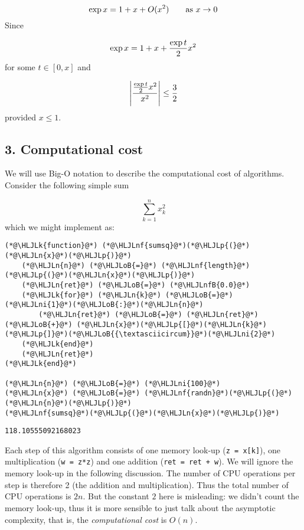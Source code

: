 \documentclass[12pt,a4paper]{article}
\newcommand{\HLJLk}[1]{\textcolor[RGB]{148,91,176}{\textbf{#1}}}
\newcommand{\HLJLn}[1]{#1}
\newcommand{\HLJLnf}[1]{\textcolor[RGB]{66,102,213}{#1}}
\newcommand{\HLJLnfB}[1]{\textcolor[RGB]{59,151,46}{#1}}
\newcommand{\HLJLni}[1]{\textcolor[RGB]{59,151,46}{#1}}
\newcommand{\HLJLoB}[1]{\textcolor[RGB]{102,102,102}{\textbf{#1}}}
\newcommand{\HLJLp}[1]{#1}
\begin{document}
\[
\exp x = 1 + x + O(x^2) \qquad \hbox{as $x \ensuremath{\rightarrow} 0$}
\]
Since

\[
\exp x = 1 + x + {\exp t \over 2} x^2
\]
for some $t \in [0,x]$ and

\[
\left|{{\exp t \over 2} x^2 \over x^2}\right| \leq {3 \over 2}
\]
provided $x \leq 1$.

\subsection{3. Computational cost}
We will use Big-O notation to describe the computational cost of algorithms. Consider the following simple sum

\[
\sum_{k=1}^n x_k^2
\]
which we might implement as:


\begin{lstlisting}
(*@\HLJLk{function}@*) (*@\HLJLnf{sumsq}@*)(*@\HLJLp{(}@*)(*@\HLJLn{x}@*)(*@\HLJLp{)}@*)
    (*@\HLJLn{n}@*) (*@\HLJLoB{=}@*) (*@\HLJLnf{length}@*)(*@\HLJLp{(}@*)(*@\HLJLn{x}@*)(*@\HLJLp{)}@*)
    (*@\HLJLn{ret}@*) (*@\HLJLoB{=}@*) (*@\HLJLnfB{0.0}@*)
    (*@\HLJLk{for}@*) (*@\HLJLn{k}@*) (*@\HLJLoB{=}@*) (*@\HLJLni{1}@*)(*@\HLJLoB{:}@*)(*@\HLJLn{n}@*)
        (*@\HLJLn{ret}@*) (*@\HLJLoB{=}@*) (*@\HLJLn{ret}@*) (*@\HLJLoB{+}@*) (*@\HLJLn{x}@*)(*@\HLJLp{[}@*)(*@\HLJLn{k}@*)(*@\HLJLp{]}@*)(*@\HLJLoB{{\textasciicircum}}@*)(*@\HLJLni{2}@*)
    (*@\HLJLk{end}@*)
    (*@\HLJLn{ret}@*)
(*@\HLJLk{end}@*)

(*@\HLJLn{n}@*) (*@\HLJLoB{=}@*) (*@\HLJLni{100}@*)
(*@\HLJLn{x}@*) (*@\HLJLoB{=}@*) (*@\HLJLnf{randn}@*)(*@\HLJLp{(}@*)(*@\HLJLn{n}@*)(*@\HLJLp{)}@*)
(*@\HLJLnf{sumsq}@*)(*@\HLJLp{(}@*)(*@\HLJLn{x}@*)(*@\HLJLp{)}@*)
\end{lstlisting}

\begin{lstlisting}
118.10555092168023
\end{lstlisting}


Each step of this algorithm consists of one memory look-up (\texttt{z = x[k]}), one multiplication (\texttt{w = z*z}) and one addition (\texttt{ret = ret + w}). We will ignore the memory look-up in the following discussion. The number of CPU operations per step is therefore 2 (the addition and multiplication). Thus the total number of CPU operations is $2n$. But the constant $2$ here is misleading: we didn't count the memory look-up, thus it is more sensible to just talk about the asymptotic complexity, that is, the \emph{computational cost} is $O(n)$.
\end{document}
